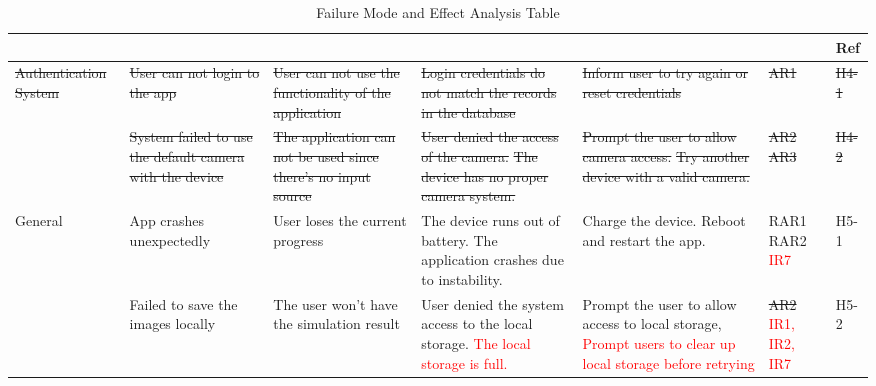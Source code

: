 \documentclass{article}
\begin{document}
\newpage

\begin{landscape}
\begin{table}[h!]
\def\arraystretch{1.7}
\begin{tabularx}{1.2\textwidth} { |X|X|X|X|X
  | p{0.9cm}
  | p{0.9cm} | }
\hline
	\centering{Component} & \centering{Failure Mode} & \centering{Effects of Failure} & \centering{Causes of Failure} & \centering{Recommended Action} & \centering{SR} & Ref \\ \hline
     

     \sout{Authentication System} & \sout{User can not login to the app} & \sout{User can not use the functionality of the application}  & \sout{Login credentials do not match the records in the database} & \sout{Inform user to try again or reset credentials} & \sout{AR1} & \sout{H4-1} \\ \cline{2-7}
     ~ & \sout{System failed to use the default camera with the device}  & \sout{The application can not be used since there's no input source} & 
    \sout{User denied the access of the camera.}  \newline
    \sout{The device has no proper camera system.}
     & 
     \sout{Prompt the user to allow camera access.} \newline
     \sout{Try another device with a valid camera.}
     & \sout{AR2} \newline \sout{AR3} & \sout{H4-2} \\ \hline   

    General & App crashes unexpectedly & User loses the current progress  &
    The device runs out of battery. \newline 
    The application crashes due to instability.  &
    Charge the device. \newline 
    Reboot and restart the app. & 
    \sout{RAR1 \newline
    RAR2} \textcolor{red}{IR7}
    &  H5-1 \\  \cline{2-7}
    ~ & Failed to save the images locally & The user won't have the simulation result & User denied the system access to the local storage. \textcolor{red}{The local storage is full.} & Prompt the user to allow access to local storage, \textcolor{red}{Prompt users to clear up local storage before retrying} & \sout{AR2} \textcolor{red}{IR1, IR2, IR7} & H5-2 \\   
    \hline

\end{tabularx}
\caption{Failure Mode and Effect Analysis Table}
\label{FMEA Table}
\end{table}
\end{landscape}
\end{document}
